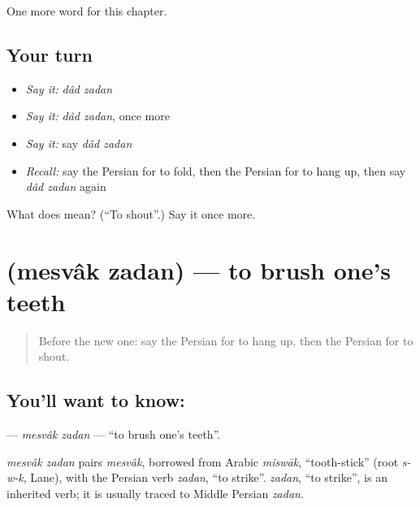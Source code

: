 \begin{grammarlens}[title={What you've built}]
One more word for this chapter.
\end{grammarlens}

\subsection*{Your turn}
\begin{itemize}
\raggedright
  \item \emph{Say it:} \emph{dâd zadan}
  \item \emph{Say it:} \emph{dâd zadan}, once more
  \item \emph{Say it:} say \emph{dâd zadan}
  \item \emph{Recall:} say the Persian for to fold, then the Persian for to hang up, then say \emph{dâd zadan} again
\end{itemize}

\begin{tcolorbox}[breakable,colback=teal!4,colframe=teal!35!black,title={Before you move on}]
What does   mean? (\textquotedblleft{}To shout\textquotedblright{}.) Say it once more.
\end{tcolorbox}
\section[\texorpdfstring{\fa{مسواک} \fa{زدن} (mesvâk zadan)}{مسواک زدن (mesvâk zadan)}]{  (mesvâk zadan) — to brush one's teeth}

\label{lesson:FA-C255-mesvak-zadan}



\begin{quote}
Before the new one: say the Persian for to hang up, then the Persian for to shout.
\end{quote}

\subsection*{You'll want to know:  }
\textbf{ } — \emph{mesvâk zadan} — \textquotedblleft{}to brush one's teeth\textquotedblright{}.

\begin{cousinweb}
\emph{mesvâk zadan} pairs \emph{mesvâk}, borrowed from Arabic \emph{miswāk}, \textquotedblleft{}tooth-stick\textquotedblright{} (root \emph{s-w-k}, Lane), with the Persian verb \emph{zadan}, \textquotedblleft{}to strike\textquotedblright{}. \emph{zadan}, \textquotedblleft{}to strike\textquotedblright{}, is an inherited verb; it is usually traced to Middle Persian \emph{zadan}.
\end{cousinweb}

